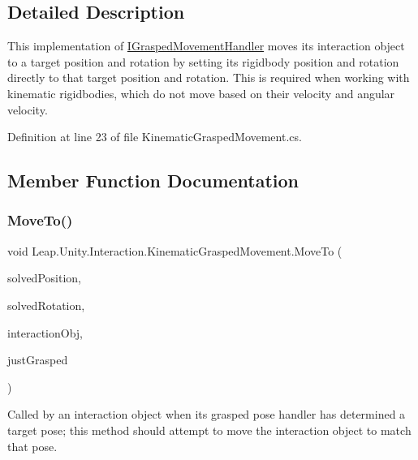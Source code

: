 \subsection{Detailed Description}
This implementation of \mbox{\hyperlink{interface_leap_1_1_unity_1_1_interaction_1_1_i_grasped_movement_handler}{I\+Grasped\+Movement\+Handler}} moves its interaction object to a target position and rotation by setting its rigidbody position and rotation directly to that target position and rotation. This is required when working with kinematic rigidbodies, which do not move based on their velocity and angular velocity. 



Definition at line 23 of file Kinematic\+Grasped\+Movement.\+cs.



\subsection{Member Function Documentation}
\mbox{\label{class_leap_1_1_unity_1_1_interaction_1_1_kinematic_grasped_movement_adfd0036833934df0d569feb112c7345e}} 
\subsubsection{\texorpdfstring{MoveTo()}{MoveTo()}}
{\footnotesize\ttfamily void Leap.\+Unity.\+Interaction.\+Kinematic\+Grasped\+Movement.\+Move\+To (\begin{DoxyParamCaption}\item[{Vector3}]{solved\+Position,  }\item[{Quaternion}]{solved\+Rotation,  }\item[{\mbox{\hyperlink{class_leap_1_1_unity_1_1_interaction_1_1_interaction_behaviour}{Interaction\+Behaviour}}}]{interaction\+Obj,  }\item[{bool}]{just\+Grasped }\end{DoxyParamCaption})}



Called by an interaction object when its grasped pose handler has determined a target pose; this method should attempt to move the interaction object to match that pose. 



